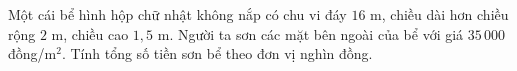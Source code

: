 \begin{ex} %
Một cái bể hình hộp chữ nhật không nắp có chu vi đáy $16\text{ m}$, chiều dài hơn chiều rộng $2\text{ m}$, chiều cao $1{,}5\text{ m}$. Người ta sơn các mặt bên ngoài của bể với giá $35\,000$ đồng/$\text{m}^2$. Tính tổng số tiền sơn bể theo đơn vị nghìn đồng.
\end{ex}
